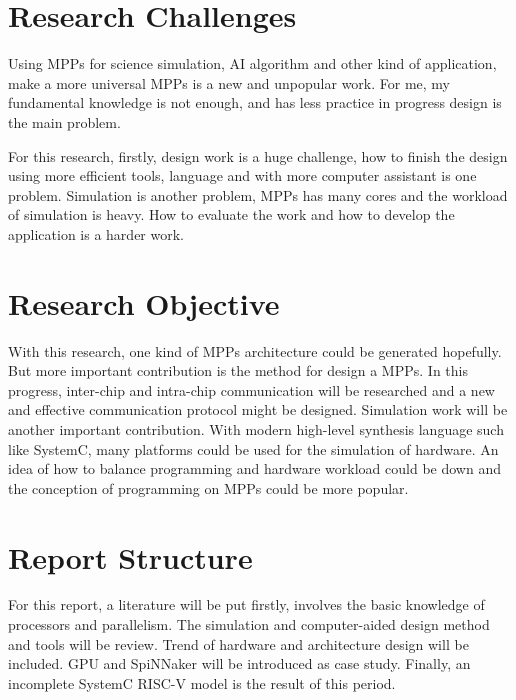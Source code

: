 \section{Research Challenges}
Using MPPs for science simulation, AI algorithm and other kind of application, make a more universal MPPs is a new and unpopular work. For me, my fundamental knowledge is not enough, and has less practice in progress design is the main problem.
\par 
For this research, firstly, design work is a huge challenge, how to finish the design using more efficient tools, language and with more computer assistant is one problem. Simulation is another problem, MPPs has many cores and the workload of simulation is heavy. How to evaluate the work and how to develop the application is a harder work. 

\section{Research Objective}
With this research, one kind of MPPs architecture could be generated hopefully. But more important contribution is the method for design a MPPs. In this progress, inter-chip and intra-chip communication will be researched and a new and effective communication protocol might be designed. Simulation work will be another important contribution. With modern high-level synthesis language such like SystemC, many platforms could be used for the simulation of hardware. An idea of how to balance programming and hardware workload could be down and the conception of programming on MPPs could be more popular.

\section{Report Structure}
For this report, a literature will be put firstly, involves the basic knowledge of processors and parallelism. The simulation and computer-aided design method and tools will be review. Trend of hardware and architecture design will be included. GPU and SpiNNaker will be introduced as case study. Finally, an incomplete SystemC RISC-V model is the result of this period. 
